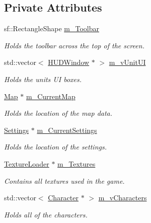 \subsection*{Private Attributes}
\begin{DoxyCompactItemize}
\item 
sf\+::\+Rectangle\+Shape \hyperlink{class_game_a7570ce885eabdfe6ce46270e0b748482}{m\+\_\+\+Toolbar}
\begin{DoxyCompactList}\small\item\em Holds the toolbar across the top of the screen. \end{DoxyCompactList}\item 
std\+::vector$<$ \hyperlink{class_h_u_d_window}{H\+U\+D\+Window} $\ast$ $>$ \hyperlink{class_game_ad86fdba05346c76590c923f9e6faeaa3}{m\+\_\+v\+Unit\+UI}
\begin{DoxyCompactList}\small\item\em Holds the units UI boxes. \end{DoxyCompactList}\item 
\hyperlink{class_map}{Map} $\ast$ \hyperlink{class_game_af94359689fff24b26c815bff70dac8d3}{m\+\_\+\+Current\+Map}
\begin{DoxyCompactList}\small\item\em Holds the location of the map data. \end{DoxyCompactList}\item 
\hyperlink{class_settings}{Settings} $\ast$ \hyperlink{class_game_a8c4d357ca59cf08c67f81c26808a61f7}{m\+\_\+\+Current\+Settings}
\begin{DoxyCompactList}\small\item\em Holds the location of the settings. \end{DoxyCompactList}\item 
\hyperlink{class_texture_loader}{Texture\+Loader} $\ast$ \hyperlink{class_game_a9e1e067209180aba519f41791fc991d7}{m\+\_\+\+Textures}
\begin{DoxyCompactList}\small\item\em Contains all textures used in the game. \end{DoxyCompactList}\item 
std\+::vector$<$ \hyperlink{class_character}{Character} $\ast$ $>$ \hyperlink{class_game_ade2bf1c1b86c07e6515a66ad36de90f4}{m\+\_\+v\+Characters}
\begin{DoxyCompactList}\small\item\em Holds all of the characters. \end{DoxyCompactList}\item 

\end{DoxyCompactItemize}
